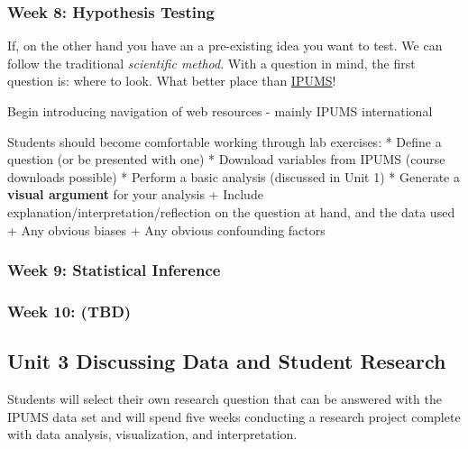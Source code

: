 \documentclass[
]{book}
\begin{document}
\hypertarget{week-8-hypothesis-testing}{%
\subsubsection*{Week 8: Hypothesis Testing}\label{week-8-hypothesis-testing}}

If, on the other hand you have an a pre-existing idea you want to test. We can follow the traditional \emph{scientific method}. With a question in mind, the first question is: where to look. What better place than \href{https://ipums.org}{IPUMS}!

Begin introducing navigation of web resources - mainly IPUMS international

Students should become comfortable working through lab exercises:
* Define a question (or be presented with one)
* Download variables from IPUMS (course downloads possible)
* Perform a basic analysis (discussed in Unit 1)
* Generate a \textbf{visual argument} for your analysis
+ Include explanation/interpretation/reflection on the question at hand, and the data used
+ Any obvious biases
+ Any obvious confounding factors

\hypertarget{week-9-statistical-inference}{%
\subsubsection*{Week 9: Statistical Inference}\label{week-9-statistical-inference}}

\hypertarget{week-10-tbd}{%
\subsubsection*{Week 10: (TBD)}\label{week-10-tbd}}

\hypertarget{unit-3-discussing-data-and-student-research}{%
\subsection*{Unit 3 Discussing Data and Student Research}\label{unit-3-discussing-data-and-student-research}}

Students will select their own research question that can be answered with the IPUMS data set and will spend five weeks conducting a research project complete with data analysis, visualization, and interpretation.
\end{document}

